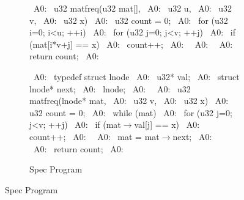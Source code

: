 \begin{figure}[H]
\begin{minipage}[c]{0.50\textwidth}
\begin{subfigure}[b]{\textwidth}
\begin{center}
\begin{allLangEnvScript}
~{\tiny \textcolor{mygray}{A0:}}~ u32 matfreq(u32 mat[],
~{\tiny \textcolor{mygray}{A0:}}~             u32 u,
~{\tiny \textcolor{mygray}{A0:}}~             u32 v,
~{\tiny \textcolor{mygray}{A0:}}~             u32 x) {
~{\tiny \textcolor{mygray}{A0:}}~   u32 count = 0;
~{\tiny \textcolor{mygray}{A0:}}~   for (u32 i=0; i<u; ++i) {
~{\tiny \textcolor{mygray}{A0:}}~     for (u32 j=0; j<v; ++j) {
~{\tiny \textcolor{mygray}{A0:}}~       if (mat[i*v+j] == x)
~{\tiny \textcolor{mygray}{A0:}}~         count++;
~{\tiny \textcolor{mygray}{A0:}}~     }
~{\tiny \textcolor{mygray}{A0:}}~   }
~{\tiny \textcolor{mygray}{A0:}}~   return count;
~{\tiny \textcolor{mygray}{A0:}}~ }
\end{allLangEnvScript}
\end{center}
\end{subfigure}
\begin{subfigure}[b]{\textwidth}
\begin{center}
\begin{allLangEnvScript}
~{\tiny \textcolor{mygray}{A0:}}~ typedef struct lnode {
~{\tiny \textcolor{mygray}{A0:}}~   u32* val;
~{\tiny \textcolor{mygray}{A0:}}~   struct lnode* next;
~{\tiny \textcolor{mygray}{A0:}}~ } lnode;
~{\tiny \textcolor{mygray}{A0:}}~ 
~{\tiny \textcolor{mygray}{A0:}}~ u32 matfreq(lnode* mat,
~{\tiny \textcolor{mygray}{A0:}}~             u32 v,
~{\tiny \textcolor{mygray}{A0:}}~             u32 x) {
~{\tiny \textcolor{mygray}{A0:}}~   u32 count = 0;
~{\tiny \textcolor{mygray}{A0:}}~   while (mat) {
~{\tiny \textcolor{mygray}{A0:}}~     for (u32 j=0; j<v; ++j) {
~{\tiny \textcolor{mygray}{A0:}}~       if (mat$\rightarrow$val[j] == x)
~{\tiny \textcolor{mygray}{A0:}}~         count++;
~{\tiny \textcolor{mygray}{A0:}}~     }
~{\tiny \textcolor{mygray}{A0:}}~     mat = mat$\rightarrow$next;
~{\tiny \textcolor{mygray}{A0:}}~   }
~{\tiny \textcolor{mygray}{A0:}}~   return count;
~{\tiny \textcolor{mygray}{A0:}}~ }
\end{allLangEnvScript}
\end{center}
\vspace{-15px}
\caption{\label{fig:Matfreq}Spec Program}
\end{subfigure}%
\end{minipage}%

\end{figure}
